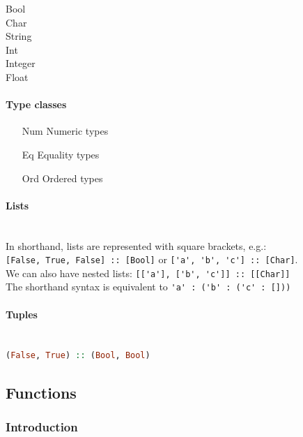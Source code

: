 \begin{description}
	\item[Bool] 
	\item[Char]
	\item[String]
	\item[Int]
	\item[Integer]
	\item[Float]
\end{description}

\paragraph{Type classes}

\begin{itemize}
	\item[Num] Numeric types
	\item[Eq] Equality types
	\item[Ord] Ordered types
\end{itemize}

\paragraph{Lists} \hfill \\

In shorthand, lists are represented with square brackets, e.g.:\\
\lstinline|[False, True, False] :: [Bool]| or \lstinline|['a', 'b', 'c'] :: [Char]|. \\
We can also have nested lists: \lstinline|[['a'], ['b', 'c']] :: [[Char]]| \\
The shorthand syntax is equivalent to \lstinline|'a' : ('b' : ('c' : []))|

\paragraph{Tuples} \hfill \\

\lstinline[language=Haskell]|(False, True) :: (Bool, Bool)|


\subsection{Functions}

\subsubsection{Introduction}


